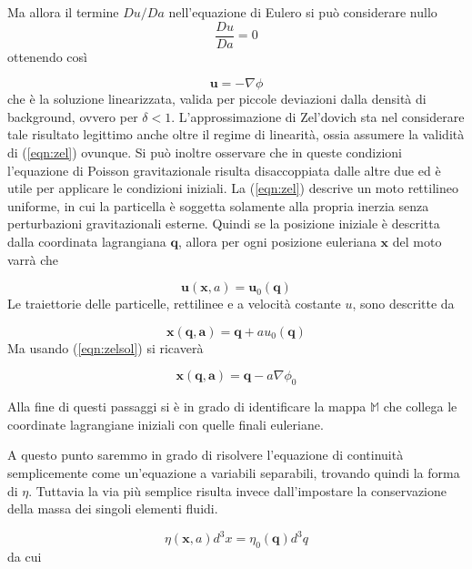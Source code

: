 Ma allora il termine $Du/Da$ nell'equazione di Eulero si può considerare nullo
\begin{equation}
    \label{eqn:zel}
    \frac{Du}{Da} = 0
\end{equation}
ottenendo così

\begin{equation}
    \label{eqn:zelsol}
    \bm{u} = -\nabla\phi
\end{equation}
che è la soluzione linearizzata, valida per piccole deviazioni dalla densità di background, ovvero per $\delta < 1$.
L'approssimazione di Zel'dovich sta nel considerare tale risultato legittimo anche oltre il regime di linearità, ossia 
assumere la validità di (\ref{eqn:zel}) ovunque.
Si può inoltre osservare che in queste condizioni l'equazione di Poisson gravitazionale risulta disaccoppiata dalle
altre due ed è utile per applicare le condizioni iniziali.
La (\ref{eqn:zel}) descrive un moto rettilineo uniforme, in cui la particella è soggetta solamente alla propria inerzia
senza perturbazioni gravitazionali esterne. Quindi se la posizione iniziale è descritta dalla coordinata lagrangiana
$\bm{q}$, allora per ogni posizione euleriana $\bm{x}$ del moto varrà che 

\begin{equation}
    \bm{u}(\bm{x}, a) = \bm{u}_0(\bm{q})
\end{equation}
Le traiettorie delle particelle, rettilinee e a velocità costante $u$, sono descritte da

\begin{equation}
    \bm{x}(\bm{q, a}) = \bm{q} + a u_0(\bm{q})
\end{equation}
Ma usando (\ref{eqn:zelsol}) si ricaverà

\begin{equation}
    \label{eqn:zelmap}
    \bm{x}(\bm{q, a}) = \bm{q} - a \nabla\phi_0
\end{equation}

Alla fine di questi passaggi si è in grado di identificare la mappa $\mathbb{M}$ che collega le coordinate lagrangiane 
iniziali con quelle finali euleriane. 

A questo punto saremmo in grado di risolvere l'equazione di continuità semplicemente come un'equazione a variabili
separabili, trovando quindi la forma di $\eta$. Tuttavia la via più semplice risulta invece dall'impostare la 
conservazione della massa dei singoli elementi fluidi.

\begin{equation}
    \eta(\bm{x}, a)d^3x=\eta_0(\bm{q})d^3q
\end{equation}
da cui

